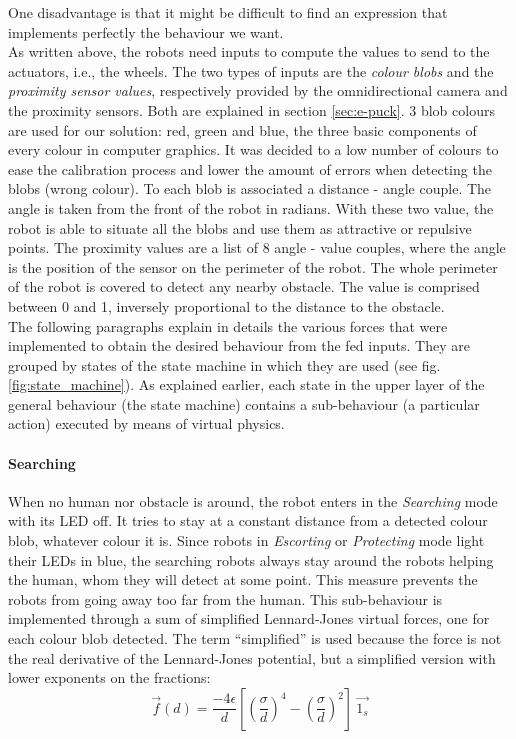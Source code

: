 \documentclass[oneside, a4paper, 12pt]{memoir}
\begin{document}
	One disadvantage is that it might be difficult to find an expression that implements perfectly the behaviour we want.\\
	
	As written above, the robots need inputs to compute the values to send to the actuators, i.e., the wheels. The two types of inputs are the \emph{colour blobs} and the \emph{proximity sensor values}, respectively provided by the omnidirectional camera and the proximity sensors. Both are explained in section \ref{sec:e-puck}. 3 blob colours are used for our solution: red, green and blue, the three basic components of every colour in computer graphics. It was decided to a low number of colours to ease the calibration process and lower the amount of errors when detecting the blobs (wrong colour). To each blob is associated a distance - angle couple. The angle is taken from the front of the robot in radians. With these two value, the robot is able to situate all the blobs and use them as attractive or repulsive points. The proximity values are a list of 8 angle - value couples, where the angle is the position of the sensor on the perimeter of the robot. The whole perimeter of the robot is covered to detect any nearby obstacle. The value is comprised between 0 and 1, inversely proportional to the distance to the obstacle.\\
	
	The following paragraphs explain in details the various forces that were implemented to obtain the desired behaviour from the fed inputs. They are grouped by states of the state machine in which they are used (see fig. \ref{fig:state_machine}). As explained earlier, each state in the upper layer of the general behaviour (the state machine) contains a sub-behaviour (a particular action) executed by means of virtual physics.
		
			\paragraph{Searching}
			
				When no human nor obstacle is around, the robot enters in the \emph{Searching} mode with its LED off. It tries to stay at a constant distance from a detected colour blob, whatever colour it is. Since robots in \emph{Escorting} or \emph{Protecting} mode light their LEDs in blue, the searching robots always stay around the robots helping the human, whom they will detect at some point. This measure prevents the robots from going away too far from the human. This sub-behaviour is implemented through a sum of simplified Lennard-Jones virtual forces, one for each colour blob detected. The term \enquote{simplified} is used because the force is not the real derivative of the Lennard-Jones potential, but a simplified version with lower exponents on the fractions:
				\begin{equation}
					\vec{f}(d) = \frac{-4\epsilon}{d} \left[ \left(\frac{\sigma}{d}\right)^{4} - \left(\frac{\sigma}{d}\right)^2 \right] ~\vec{1_s}
					\label{eq:lennard-jones_force_simplified}
				\end{equation}
				
\end{document}
